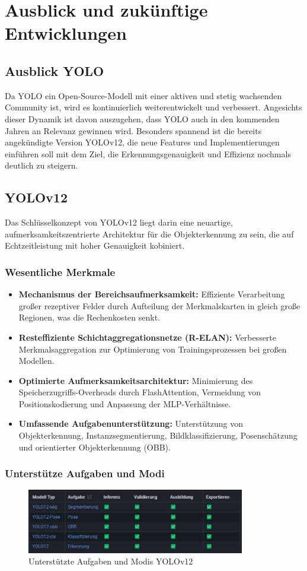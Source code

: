 \section{Ausblick und zukünftige Entwicklungen}
\subsection{Ausblick YOLO}
Da YOLO ein Open-Source-Modell mit einer aktiven und stetig wachsenden Community ist, wird es kontinuierlich weiterentwickelt und verbessert. Angesichts dieser Dynamik ist davon auszugehen, dass YOLO auch in den kommenden Jahren an Relevanz gewinnen wird. Besonders spannend ist die bereits angekündigte Version YOLOv12, die neue Features und Implementierungen einführen soll mit dem Ziel, die Erkennungsgenauigkeit und Effizienz nochmals deutlich zu steigern.
\subsection{YOLOv12\cite{Jocher2025YOLO12}}
Das Schlüsselkonzept von YOLOv12 liegt darin eine neuartige, aufmerksamkeitszentrierte Architektur für die Objekterkennung zu sein, die auf Echtzeitleistung mit hoher Genauigkeit kobiniert.
\subsubsection{Wesentliche Merkmale}
\begin{itemize}
    \item \textbf{Mechanismus der Bereichsaufmerksamkeit:} Effiziente Verarbeitung großer rezeptiver Felder durch Aufteilung der Merkmalskarten in gleich große Regionen, was die Rechenkosten senkt.
    \item \textbf{Resteffiziente Schichtaggregationsnetze (R-ELAN):} Verbesserte Merkmalsaggregation zur Optimierung von Trainingsprozessen bei großen Modellen.
    \item \textbf{Optimierte Aufmerksamkeitsarchitektur:} Minimierung des Speicherzugriffs-Overheads durch FlashAttention, Vermeidung von Positionskodierung und Anpassung der MLP-Verhältnisse.
    \item \textbf{Umfassende Aufgabenunterstützung:} Unterstützung von Objekterkennung, Instanzsegmentierung, Bildklassifizierung, Posenschätzung und orientierter Objekterkennung (OBB).
\end{itemize}
\subsubsection{Unterstütze Aufgaben und Modi}
\begin{figure}[ht]
    \centering
    \includegraphics[width=0.85\textwidth]{data/AufgabenUndModiYOLO12.png}
    \caption{Unterstützte Aufgaben und Modis YOLOv12}
    \label{fig:YOLOv12_unterstützte_Modi}
\end{figure}
